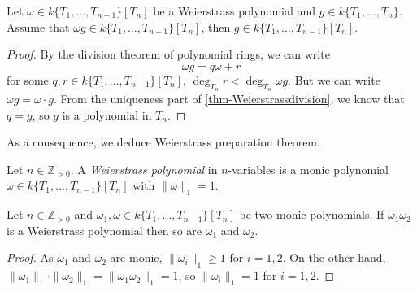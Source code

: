 \begin{lemma}\label{lma-Weierstrasspolycancel2}
    Let $\omega\in k\{ T_1,\ldots,T_{n-1}\}[T_n] $ be a Weierstrass polynomial and $g\in k\{ T_1,\ldots,T_{n}\}$. Assume that $\omega g\in k\{ T_1,\ldots,T_{n-1}\}[T_n]$, then $g\in k\{ T_1,\ldots,T_{n-1}\}[T_n]$.
\end{lemma}
\begin{proof}
    By the division theorem of polynomial rings, we can write
    \[
        \omega g = q\omega+r  
    \]
    for some $q,r\in k\{ T_1,\ldots,T_{n-1}\}[T_n]$, $\deg_{T_n}r<\deg_{T_n}\omega g$. But we can write $\omega g= \omega \cdot g$. From the uniqueness part of \cref{thm-Weierstrassdivision}, we know that $q=g$, so $g$ is a polynomial in $T_n$.
\end{proof}

As a consequence, we deduce Weierstrass preparation theorem.
\begin{definition}
    Let $n\in \mathbb{Z}_{>0}$. A \emph{Weierstrass polynomial} in $n$-variables is a monic polynomial $\omega\in k\{T_1,\ldots,T_{n-1}\}[T_n]$ with $\|\omega\|_1=1$.
\end{definition}
\begin{lemma}\label{lma-Weierstrassfact}
    Let $n\in \mathbb{Z}_{>0}$ and $\omega_1,\omega\in k\{T_1,\ldots,T_{n-1}\}[T_n]$ be two monic polynomials. If $\omega_1\omega_2$ is a Weierstrass polynomial then so are $\omega_1$ and $\omega_2$.
\end{lemma}
\begin{proof}
    As $\omega_1$ and $\omega_2$ are monic, $\|\omega_i\|_1\geq 1$ for $i=1,2$. On the other hand, $\|\omega_1\|_1\cdot\|\omega_2\|_1=\|\omega_1\omega_2\|_1=1$, so $\|\omega_i\|_1= 1$ for $i=1,2$.
\end{proof}

